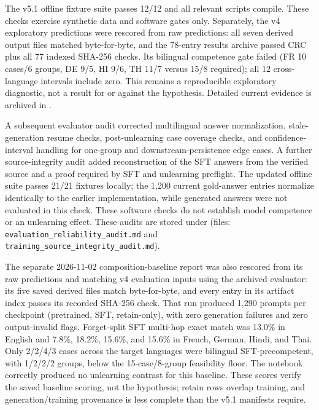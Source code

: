 \documentclass[10pt,a4paper]{article}
\begin{document}
The v5.1 offline fixture suite passes 12/12 and all relevant scripts compile. These checks exercise synthetic data and software gates only. Separately, the v4 exploratory predictions were rescored from raw predictions: all seven derived output files matched byte-for-byte, and the 78-entry results archive passed CRC plus all 77 indexed SHA-256 checks. Its bilingual competence gate failed (FR 10 cases/6 groups, DE 9/5, HI 9/6, TH 11/7 versus 15/8 required); all 12 cross-language intervals include zero. This remains a reproducible exploratory diagnostic, not a result for or against the hypothesis. Detailed current evidence is archived in .

A subsequent evaluator audit corrected multilingual answer normalization, stale-generation resume checks, post-unlearning case coverage checks, and confidence-interval handling for one-group and downstream-persistence edge cases. A further source-integrity audit added reconstruction of the SFT answers from the verified source and a proof required by SFT and unlearning preflight. The updated offline suite passes 21/21 fixtures locally; the 1,200 current gold-answer entries normalize identically to the earlier implementation, while generated answers were not evaluated in this check. These software checks do not establish model competence or an unlearning effect. These audits are stored under  (files: \texttt{evaluation\_reliability\_audit.md} and \texttt{training\_source\_integrity\_audit.md}).

The separate 2026-11-02 composition-baseline report was also rescored from its raw predictions and matching v4 evaluation inputs using the archived evaluator: its five saved derived files match byte-for-byte, and every entry in its artifact index passes its recorded SHA-256 check. That run produced 1,290 prompts per checkpoint (pretrained, SFT, retain-only), with zero generation failures and zero output-invalid flags. Forget-split SFT multi-hop exact match was 13.0\% in English and 7.8\%, 18.2\%, 15.6\%, and 15.6\% in French, German, Hindi, and Thai. Only 2/2/4/3 cases across the target languages were bilingual SFT-precompetent, with 1/2/2/2 groups, below the 15-case/8-group feasibility floor. The notebook correctly produced no unlearning contrast for this baseline. These scores verify the saved baseline scoring, not the hypothesis; retain rows overlap training, and generation/training provenance is less complete than the v5.1 manifests require.
\end{document}
